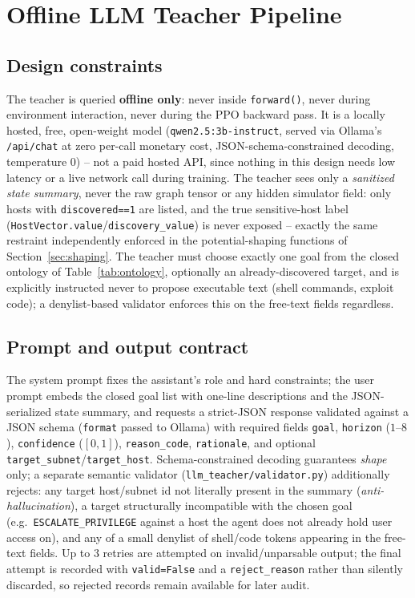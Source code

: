 \documentclass[11pt]{article}
\newcommand{\code}[1]{\texttt{#1}}
\begin{document}
\section{Offline LLM Teacher Pipeline}
\label{sec:teacher}

\subsection{Design constraints}
The teacher is queried \textbf{offline only}: never inside \code{forward()}, never
during environment interaction, never during the PPO backward pass. It is a locally
hosted, free, open-weight model (\code{qwen2.5:3b-instruct}, served via Ollama's
\code{/api/chat} at zero per-call monetary cost, JSON-schema-constrained decoding,
temperature 0) -- not a paid hosted API, since nothing in this design needs low
latency or a live network call during training. The teacher sees only a
\emph{sanitized state summary}, never the raw graph tensor or any hidden simulator
field: only hosts with \code{discovered==1} are listed, and the true
sensitive-host label (\code{HostVector.value}/\code{discovery\_value}) is never
exposed -- exactly the same restraint independently enforced in the potential-shaping
functions of Section~\ref{sec:shaping}. The teacher must choose exactly one goal from
the closed ontology of Table~\ref{tab:ontology}, optionally an already-discovered
target, and is explicitly instructed never to propose executable text (shell
commands, exploit code); a denylist-based validator enforces this on the free-text
fields regardless.

\subsection{Prompt and output contract}
The system prompt fixes the assistant's role and hard constraints; the user prompt
embeds the closed goal list with one-line descriptions and the JSON-serialized state
summary, and requests a strict-JSON response validated against a JSON schema
(\code{format} passed to Ollama) with required fields \code{goal}, \code{horizon}
($1$--$8$), \code{confidence} ($[0,1]$), \code{reason\_code}, \code{rationale}, and
optional \code{target\_subnet}/\code{target\_host}. Schema-constrained decoding
guarantees \emph{shape} only; a separate semantic validator
(\code{llm\_teacher/validator.py}) additionally rejects: any target host/subnet id
not literally present in the summary (\emph{anti-hallucination}), a target
structurally incompatible with the chosen goal (e.g.\ \code{ESCALATE\_PRIVILEGE}
against a host the agent does not already hold user access on), and any of a small
denylist of shell/code tokens appearing in the free-text fields. Up to 3 retries are
attempted on invalid/unparsable output; the final attempt is recorded with
\code{valid=False} and a \code{reject\_reason} rather than silently discarded, so
rejected records remain available for later audit.
\end{document}
